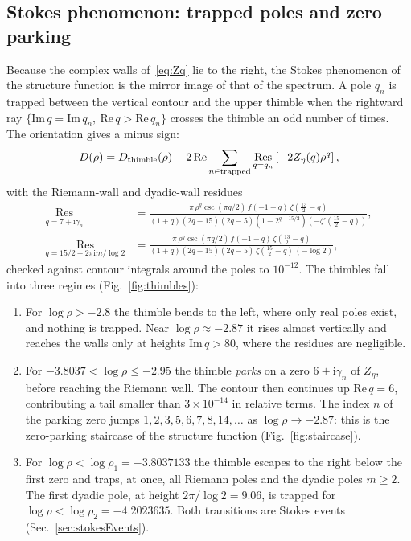 \documentclass[floatfix,aps,pre,preprint,superscriptaddress,nofootinbib,amsmath,amssymb]{revtex4-2}
\def\I{\mathrm{i}}
\newcommand{\Res}{\operatorname*{Res}}
\begin{document}
\subsection{Stokes phenomenon: trapped poles and zero parking}

Because the complex walls of~\eqref{eq:Zq} lie to the right, the Stokes phenomenon of the structure function is the mirror
image of that of the spectrum. A pole $q_n$ is trapped between the vertical contour and the upper thimble when the rightward
ray $\{\mathrm{Im}\,q=\mathrm{Im}\,q_n,\ \mathrm{Re}\,q>\mathrm{Re}\,q_n\}$ crosses the thimble an odd number of times. The
orientation gives a minus sign:
\begin{equation}
    D(\rho)=D_{\rm thimble}(\rho)-2\,\mathrm{Re}\sum_{n\in\text{trapped}}\Res_{q=q_n}\left[-2Z_\eta(q)\rho^{q}\right],
    \label{eq:Stokes}
\end{equation}
with the Riemann-wall and dyadic-wall residues
\begin{align}
    \Res_{q=7+\I\gamma_n}&=\frac{\pi\,\rho^{q}\csc(\pi q/2)\,f(-1-q)\,\zeta\!\left(\frac{13}{2}-q\right)}
    {(1+q)(2q-15)(2q-5)\left(1-2^{q-15/2}\right)\left(-\zeta'\!\left(\frac{15}{2}-q\right)\right)},\\
    \Res_{q=15/2+2\pi\I m/\log2}&=\frac{\pi\,\rho^{q}\csc(\pi q/2)\,f(-1-q)\,\zeta\!\left(\frac{13}{2}-q\right)}
    {(1+q)(2q-15)(2q-5)\,\zeta\!\left(\frac{15}{2}-q\right)\,(-\log 2)} ,
\end{align}
checked against contour integrals around the poles to $10^{-12}$. The thimbles fall into three regimes (Fig.~\ref{fig:thimbles}):
\begin{enumerate}
\item For $\log\rho>-2.8$ the thimble bends to the left, where only real poles exist, and nothing is trapped. Near
$\log\rho\approx-2.87$ it rises almost vertically and reaches the walls only at heights $\mathrm{Im}\,q>80$, where the
residues are negligible.
\item For $-3.8037<\log\rho\le-2.95$ the thimble \emph{parks} on a zero $6+\I\gamma_n$ of $Z_\eta$, before reaching the Riemann
wall. The contour then continues up $\mathrm{Re}\,q=6$, contributing a tail smaller than $3\times10^{-14}$ in relative terms. The
index $n$ of the parking zero jumps $1,2,3,5,6,7,8,14,\ldots$ as $\log\rho\to-2.87$: this is the zero-parking staircase of the
structure function (Fig.~\ref{fig:staircase}).
\item For $\log\rho<\log\rho_1=-3.8037133$ the thimble escapes to the right below the first zero and traps, at once, all
Riemann poles and the dyadic poles $m\ge2$. The first dyadic pole, at height $2\pi/\log2=9.06$, is trapped for
$\log\rho<\log\rho_2=-4.2023635$. Both transitions are Stokes events (Sec.~\ref{sec:stokesEvents}).
\end{enumerate}
\end{document}
